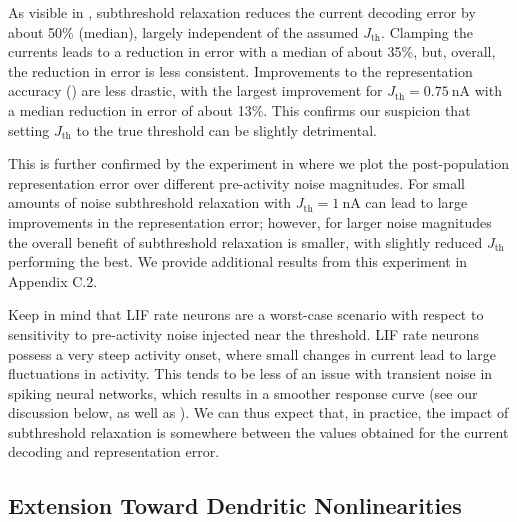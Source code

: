 As visible in , subthreshold relaxation reduces the current decoding error by about 50\% (median), largely independent of the assumed $J_\mathrm{th}$.
Clamping the currents leads to a reduction in error with a median of about 35\%, but, overall, the reduction in error is less consistent.
Improvements to the representation accuracy () are less drastic, with the largest improvement for $J_\mathrm{th} = \SI{0.75}{\nano\ampere}$ with a median reduction in error of about 13\%.
This confirms our suspicion that setting $J_\mathrm{th}$ to the true threshold can be slightly detrimental.

This is further confirmed by the experiment in  where we plot the post-population representation error over different pre-activity noise magnitudes.
For small amounts of noise subthreshold relaxation with $J_\mathrm{th} = \SI{1}{\nano\ampere}$ can lead to large improvements in the representation error; however, for larger noise magnitudes the overall benefit of subthreshold relaxation is smaller, with slightly reduced $J_\mathrm{th}$ performing the best.
We provide additional results from this experiment in Appendix C.2.

Keep in mind that LIF rate neurons are a worst-case scenario with respect to sensitivity to pre-activity noise injected near the threshold.
LIF rate neurons possess a very steep activity onset, where small changes in current lead to large fluctuations in activity.
This tends to be less of an issue with transient noise in spiking neural networks, which results in a smoother response curve (see our discussion below, as well as \cite{hunsberger2015spiking}).
We can thus expect that, in practice, the impact of subthreshold relaxation is somewhere between the values obtained for the current decoding and representation error.

\subsection{Extension Toward Dendritic Nonlinearities}
\label{sec:nef_nonlinear}

